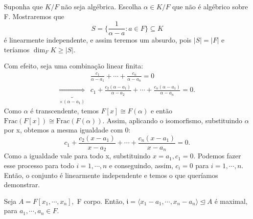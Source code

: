 \documentclass[algebraII_notes.tex]{subfiles}
\begin{document}
\begin{proof*}
	Suponha que \(K/F\) não seja algébrica. Escolha \(\alpha \in K/F\) que não é
	algébrico sobre F. Mostraremos que
	\[
		S = \biggl\{\frac{1}{\alpha - a}: a\in F\biggr\}\subseteq{K}
	\]
	é linearmente independente, e assim teremos um absurdo, pois \(|S| = |F|\) e teríamos
	\(\dim_{F}K\geq |S|.\)

	Com efeito, seja uma combinação linear finita:
	\begin{align*}
		                                                  & \frac{c_{1}}{\alpha - a_{1}} + \cdots + \frac{c_{n}}{\alpha - a_{n}} = 0                                          \\
		\underbrace{\Rightarrow}_{\times (\alpha -a_{1})} & c_{1} + \frac{c_{2}(\alpha - a_{1})}{\alpha - a_{2}} + \cdots + \frac{c_{n}(\alpha - a_{1})}{\alpha - a_{n}} = 0.
	\end{align*}
	Como \(\alpha \) é transcendente, temos \(F[x]\cong{F(\alpha )}\) e então \(\mathrm{Frac}(F[x])\cong{\mathrm{Frac}(F(\alpha ))}\).
	Assim, aplicando o isomorfismo, substituindo \(\alpha \) por x, obtemos a mesma igualdade com 0:
	\[
		c_{1} + \frac{c_{2}(x-a_{1})}{x-a_{2}} + \cdots + \frac{c_{n}(x-a_{1})}{x-a_{n}} = 0.
	\]
	Como a igualdade vale para todo x, substituindo \(x=a_{1}, c_{1} = 0.\) Podemos fazer esse processo para
	todo \(i=1, \cdots, n\) e conseguindo, assim, \(c_{i} = 0\) para \(i=1, \cdots, n.\) Então, o conjunto é linearmente independente
	e temos o que queríamos demonstrar. \qedsymbol
\end{proof*}
\begin{theorem*}
	Seja \(A = F[x_{1}, \cdots, x_{n}],\) F corpo. Então, \(\mathfrak{i} = \langle x_{1}-a_{1}, \cdots, x_{n}-a_{n}\rangle \trianglelefteq{A}\)
	é maximal, para \(a_{1}, \cdots, a_{n}\in F\).
\end{theorem*}
\end{document}
